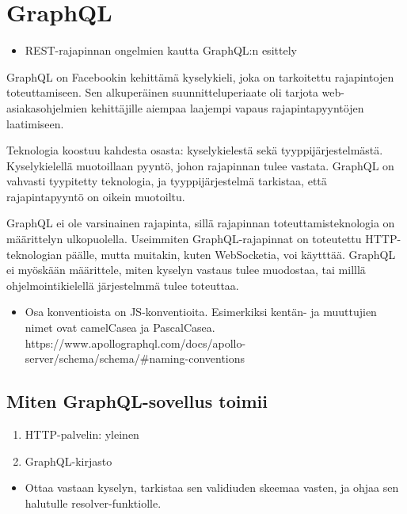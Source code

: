 \hypertarget{graphql}{%
\section{GraphQL}\label{graphql}}

\begin{itemize}
\tightlist
\item
  REST-rajapinnan ongelmien kautta GraphQL:n esittely
\end{itemize}

GraphQL on Facebookin kehittämä kyselykieli, joka on tarkoitettu
rajapintojen toteuttamiseen. Sen alkuperäinen suunnitteluperiaate oli
tarjota web-asiakasohjelmien kehittäjille aiempaa laajempi vapaus
rajapintapyyntöjen laatimiseen. \cite{graphql:spec}

Teknologia koostuu kahdesta osasta: kyselykielestä sekä
tyyppijärjestelmästä. Kyselykielellä muotoillaan pyyntö, johon
rajapinnan tulee vastata. GraphQL on vahvasti tyypitetty teknologia, ja
tyyppijärjestelmä tarkistaa, että rajapintapyyntö on oikein muotoiltu.

GraphQL ei ole varsinainen rajapinta, sillä rajapinnan
toteuttamisteknologia on määrittelyn ulkopuolella. Useimmiten
GraphQL-rajapinnat on toteutettu HTTP-teknologian päälle, mutta
muitakin, kuten WebSocketia, voi käytttää. GraphQL ei myöskään
määrittele, miten kyselyn vastaus tulee muodostaa, tai milllä
ohjelmointikielellä järjestelmmä tulee toteuttaa.

\begin{itemize}
\tightlist
\item
  Osa konventioista on JS-konventioita. Esimerkiksi kentän- ja
  muuttujien nimet ovat camelCasea ja PascalCasea.
  https://www.apollographql.com/docs/apollo-server/schema/schema/\#naming-conventions
\end{itemize}

\hypertarget{miten-graphql-sovellus-toimii}{%
\subsection{Miten GraphQL-sovellus
toimii}\label{miten-graphql-sovellus-toimii}}

\begin{enumerate}
\def\labelenumi{\arabic{enumi}.}
\tightlist
\item
  HTTP-palvelin: yleinen
\item
  GraphQL-kirjasto
\end{enumerate}

\begin{itemize}
\tightlist
\item
  Ottaa vastaan kyselyn, tarkistaa sen validiuden skeemaa vasten, ja
  ohjaa sen halutulle resolver-funktiolle.
\end{itemize}

